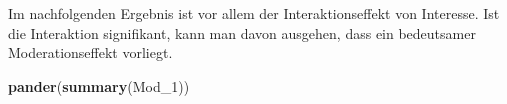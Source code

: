 \documentclass[]{article}
\newenvironment{Shaded}{\begin{snugshade}}{\end{snugshade}}
\newcommand{\DecValTok}[1]{\textcolor[rgb]{0.00,0.00,0.81}{#1}}
\newcommand{\KeywordTok}[1]{\textcolor[rgb]{0.13,0.29,0.53}{\textbf{#1}}}
\newcommand{\NormalTok}[1]{#1}
\newcommand{\OperatorTok}[1]{\textcolor[rgb]{0.81,0.36,0.00}{\textbf{#1}}}
\newcommand{\StringTok}[1]{\textcolor[rgb]{0.31,0.60,0.02}{#1}}
\begin{document}
\begin{Shaded}
\end{Shaded}

Im nachfolgenden Ergebnis ist vor allem der Interaktionseffekt von Interesse. Ist die Interaktion signifikant, kann man davon ausgehen, dass ein bedeutsamer Moderationseffekt vorliegt.

\begin{Shaded}
\begin{Highlighting}[]
    \KeywordTok{pander}\NormalTok{(}\KeywordTok{summary}\NormalTok{(Mod_}\DecValTok{1}\NormalTok{))}
\end{Highlighting}
\end{Shaded}
\end{document}
